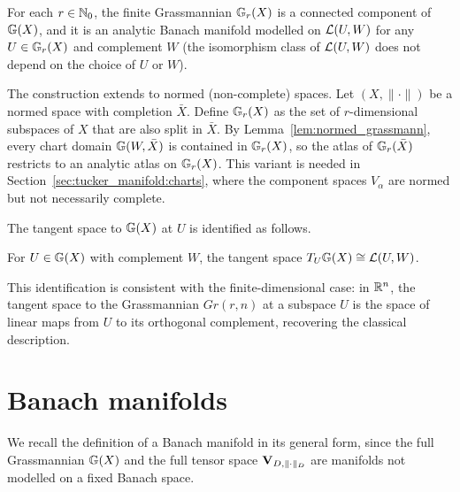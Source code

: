 \begin{proposition}
\label{prop:grassr_connected}
For each $r \in \mathbb{N}_0$, the finite Grassmannian $\mathbb{G}_{r}(X)$ is a
connected component of $\mathbb{G}(X)$, and it is an analytic Banach manifold
modelled on $\mathcal{L}(U, W)$ for any $U \in \mathbb{G}_{r}(X)$ and complement $W$
\textup{(}the isomorphism class of $\mathcal{L}(U, W)$ does not depend on the
choice of $U$ or $W$\textup{)}.
\end{proposition}

\begin{remark}
\label{rem:grassmann_normed}
The construction extends to normed (non-complete) spaces. Let
$(X, \|\cdot\|)$ be a normed space with completion $\bar X$. Define
$\mathbb{G}_{r}(X)$ as the set of $r$-dimensional subspaces of $X$ that are
also split in $\bar X$. By Lemma~\ref{lem:normed_grassmann}, every chart
domain $\mathbb{G}(W, \bar X)$ is contained in $\mathbb{G}_{r}(X)$, so the atlas
of $\mathbb{G}_{r}(\bar X)$ restricts to an analytic atlas on $\mathbb{G}_{r}(X)$.
This variant is needed in Section~\ref{sec:tucker_manifold:charts}, where
the component spaces $V_\alpha$ are normed but not necessarily complete.
\end{remark}

The tangent space to $\mathbb{G}(X)$ at $U$ is identified as follows.

\begin{proposition}
\label{prop:grassmann_tangent}
For $U \in \mathbb{G}(X)$ with complement $W$, the tangent space
$T_U \mathbb{G}(X) \cong \mathcal{L}(U, W)$.
\end{proposition}

This identification is consistent with the finite-dimensional case: in
$\mathbb{R}^n$, the tangent space to the Grassmannian $Gr(r, n)$ at a subspace
$U$ is the space of linear maps from $U$ to its orthogonal complement,
recovering the classical description.

\section{Banach manifolds}
\label{sec:banach:manifolds}

We recall the definition of a Banach manifold in its general form, since
the full Grassmannian $\mathbb{G}(X)$ and the full tensor space
$\mathbf{V}_{D,\|\cdot\|_D}$ are manifolds not modelled on a fixed Banach space.

